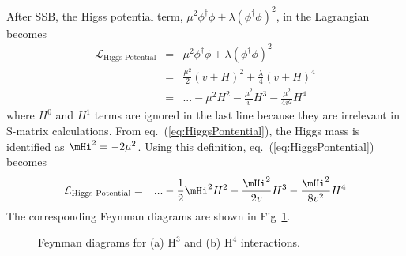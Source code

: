 After SSB, the Higss potential term,  
$\mu^2 \phi^\dagger \phi + \lambda \left( \phi^\dagger \phi \right)^2 $,
in the Lagrangian becomes 
\begin{eqnarray} 
\mathcal{L}_{\textrm{Higgs Potential}}
&=&   
\mu^2 \phi^\dagger \phi + \lambda \left( \phi^\dagger \phi \right)^2 \\ 
&=&   
\frac{\mu^2}{2} ( v + H )^2 + \frac{\lambda}{4} ( v + H )^4 \\ 
&=& 
\label{eq:HiggsPontential}
... - \mu^2 H^2 - \frac{\mu^2}{v} H^3  - \frac{\mu^2}{4v^2} H^4 
\end{eqnarray} 
where $H^0$ and $H^1$ terms are ignored in the last line
because they are irrelevant in S-matrix calculations. 
From eq.~(\ref{eq:HiggsPontential}), the Higgs mass is identified 
as $\mHi^2 =  -2\mu^2$. %
Using this definition, eq.~(\ref{eq:HiggsPontential}) becomes 
\begin{eqnarray} 
\mathcal{L}_{\textrm{Higgs Potential}}
&=& 
... - \frac{1}{2} \mHi^2 H^2 - \frac{\mHi^2}{2v} H^3  - \frac{\mHi^2}{8v^2} H^4    
\end{eqnarray}
The corresponding Feynman diagrams are shown in Fig~\ref{fig:fd_Hselfterm}. 
%
\begin{figure}[htp]
\centering
\vspace{1cm}
\hspace{1cm}
\caption{ Feynman diagrams for (a) $\textrm{H}^3$ and (b) $\textrm{H}^4$ interactions.
}
\vspace{0.5cm}
\label{fig:fd_Hselfterm}
\end{figure}

